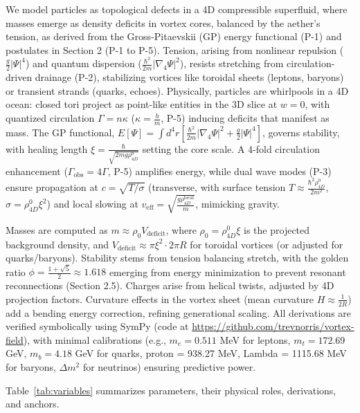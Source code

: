 We model particles as topological defects in a 4D compressible superfluid, where masses emerge as density deficits in vortex cores, balanced by the aether's tension, as derived from the Gross-Pitaevskii (GP) energy functional (P-1) and postulates in Section 2 (P-1 to P-5). Tension, arising from nonlinear repulsion ($\frac{g}{2} |\Psi|^4$) and quantum dispersion ($\frac{\hbar^2}{2m} |\nabla_4 \Psi|^2$), resists stretching from circulation-driven drainage (P-2), stabilizing vortices like toroidal sheets (leptons, baryons) or transient strands (quarks, echoes). Physically, particles are whirlpools in a 4D ocean: closed tori project as point-like entities in the 3D slice at $w=0$, with quantized circulation $\Gamma = n \kappa$ ($\kappa = \frac{h}{m}$, P-5) inducing deficits that manifest as mass. The GP functional, $E[\Psi] = \int d^4 r \left[ \frac{\hbar^2}{2 m} |\nabla_4 \Psi|^2 + \frac{g}{2} |\Psi|^4 \right]$, governs stability, with healing length $\xi = \frac{\hbar}{\sqrt{2 m g \rho_{4D}^0}}$ setting the core scale. A 4-fold circulation enhancement ($\Gamma_{\text{obs}} = 4\Gamma$, P-5) amplifies energy, while dual wave modes (P-3) ensure propagation at $c = \sqrt{T / \sigma}$ (transverse, with surface tension $T \approx \frac{\hbar^2 \rho_{4D}^0}{2 m^2}$, $\sigma = \rho_{4D}^0 \xi^2$) and local slowing at $v_{\text{eff}} = \sqrt{\frac{g \rho_{4D}^{\text{local}}}{m}}$, mimicking gravity.

Masses are computed as $m \approx \rho_0 V_{\text{deficit}}$, where $\rho_0 = \rho_{4D}^0 \xi$ is the projected background density, and $V_{\text{deficit}} \approx \pi \xi^2 \cdot 2\pi R$ for toroidal vortices (or adjusted for quarks/baryons). Stability stems from tension balancing stretch, with the golden ratio $\phi = \frac{1 + \sqrt{5}}{2} \approx 1.618$ emerging from energy minimization to prevent resonant reconnections (Section 2.5). Charges arise from helical twists, adjusted by 4D projection factors. Curvature effects in the vortex sheet (mean curvature $H \approx \frac{1}{2R}$) add a bending energy correction, refining generational scaling. All derivations are verified symbolically using SymPy (code at \url{https://github.com/trevnorris/vortex-field}), with minimal calibrations (e.g., $m_e = 0.511$ MeV for leptons, $m_t = 172.69$ GeV, $m_b = 4.18$ GeV for quarks, proton = 938.27 MeV, Lambda = 1115.68 MeV for baryons, $\Delta m^2$ for neutrinos) ensuring predictive power.

Table~\ref{tab:variables} summarizes parameters, their physical roles, derivations, and anchors.

